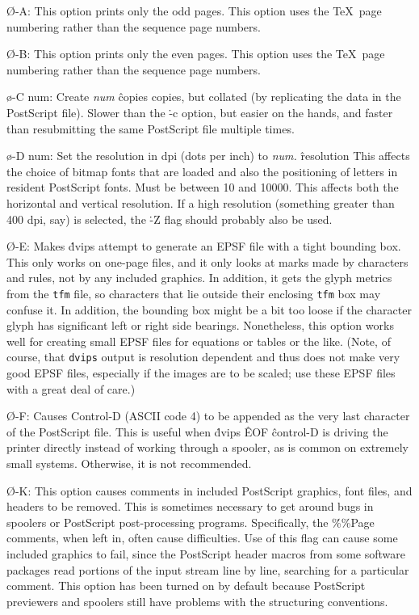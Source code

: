 {\O-A:
This option prints only the odd pages.	This option uses the \TeX\
page numbering rather than the sequence page numbers.

\O-B:
This option prints only the even pages.  This option uses the \TeX\
page numbering rather than the sequence page numbers.

\o-C num:
Create {\it num}
\^{copies}
copies, but collated (by replicating the data in the PostScript file).
Slower than the \.{-c} option, but easier on the hands, and faster than
resubmitting the same PostScript file multiple times.

\o-D num:
Set the resolution in dpi (dots per inch) to {\it num.}
\^{resolution}
This affects the choice of bitmap fonts that are loaded and also the positioning
of letters in resident PostScript fonts. Must be between 10 and 10000.
This affects both the horizontal and vertical resolution.  If a high resolution
(something greater than 400 dpi, say) is selected, the \.{-Z} flag should
probably also be used.

\O-E:
Makes \.{dvips} attempt to generate an EPSF file with a tight bounding
box.  This only works on one-page files, and it only looks at marks made
by characters and rules, not by any included graphics.	In addition, it
gets the glyph metrics from the {\tt tfm} file, so characters that
lie outside their enclosing {\tt tfm} box may confuse it.  In addition,
the bounding box might be a bit too loose if the character glyph has
significant left or right side bearings.  Nonetheless, this option works
well for creating small EPSF files for equations or tables or the like.
(Note, of course, that {\tt dvips} output is resolution dependent and
thus does not make very good EPSF files, especially if the images are
to be scaled; use these EPSF files with a great deal of care.)

\O-F:
Causes Control-D (ASCII code 4) to be appended as the very last character
of the PostScript file.  This is useful when \.{dvips}
\^{EOF}
\^{control-D}
is driving the printer directly instead of working through a spooler,
as is common on extremely small systems.  Otherwise, it is not recommended.

\O-K:
This option causes comments in included PostScript graphics, font files,
and headers to be removed.  This is sometimes necessary to get around bugs
in spoolers or PostScript post-processing programs.  Specifically, the
\.{\%\%Page} comments, when left in, often cause difficulties.
Use of this flag can cause some included graphics to fail, since the
PostScript header macros from some software packages read portions of
the input stream line by line, searching for a particular comment.
This option has been turned on by default because PostScript previewers
and spoolers still have problems with the structuring conventions.

}
